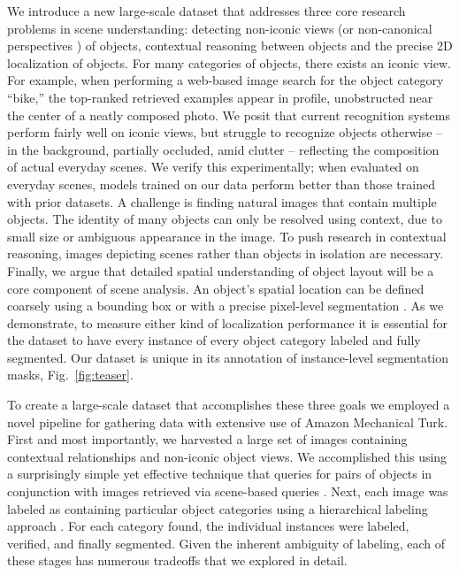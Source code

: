 We introduce a new large-scale dataset that addresses three core research problems in scene understanding: detecting non-iconic views (or non-canonical perspectives \cite{Palmer1981}) of objects, contextual reasoning between objects and the precise 2D localization of objects. For many categories of objects, there exists an iconic view. For example, when performing a web-based image search for the object category ``bike,'' the top-ranked retrieved examples appear in profile, unobstructed near the center of a neatly composed photo. We posit that current recognition systems perform fairly well on iconic views, but struggle to recognize objects otherwise -- in the background, partially occluded, amid clutter \cite{diagnosing} -- reflecting the composition of actual everyday scenes. We verify this experimentally; when evaluated on everyday scenes, models trained on our data perform better than those trained with prior datasets. A challenge is finding natural images that contain multiple objects. The identity of many objects can only be resolved using context, due to small size or ambiguous appearance in the image. To push research in contextual reasoning, images depicting scenes \cite{SUN} rather than objects in isolation are necessary. Finally, we argue that detailed spatial understanding of object layout will be a core component of scene analysis. An object's spatial location can be defined coarsely using a bounding box \cite{PASCAL} or with a precise pixel-level segmentation \cite{brostow2009semantic,LabelMe,bell13opensurfaces}. As we demonstrate, to measure either kind of localization performance it is essential for the dataset to have every instance of every object category labeled and fully segmented. Our dataset is unique in its annotation of instance-level segmentation masks, Fig.~\ref{fig:teaser}.

To create a large-scale dataset that accomplishes these three goals we employed a novel pipeline for gathering data with extensive use of Amazon Mechanical Turk. First and most importantly, we harvested a large set of images containing contextual relationships and non-iconic object views. We accomplished this using a surprisingly simple yet effective technique that queries for pairs of objects in conjunction with images retrieved via scene-based queries \cite{ordonez2011im2text,SUN}. Next, each image was labeled as containing particular object categories using a hierarchical labeling approach \cite{Olga}. For each category found, the individual instances were labeled, verified, and finally segmented. Given the inherent ambiguity of labeling, each of these stages has numerous tradeoffs that we explored in detail.

